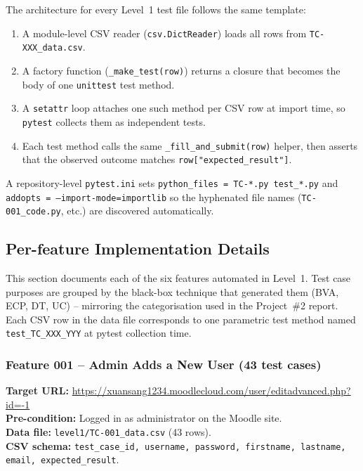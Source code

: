 \documentclass[twoside,final]{hcmut-report}
\begin{document}
The architecture for every Level~1 test file follows the same template:
\begin{enumerate}
    \item A module-level CSV reader (\texttt{csv.DictReader}) loads all rows from \texttt{TC-XXX\_data.csv}.
    \item A factory function (\texttt{\_make\_test(row)}) returns a closure that becomes the body of one \texttt{unittest} test method.
    \item A \texttt{setattr} loop attaches one such method per CSV row at import time, so \texttt{pytest} collects them as independent tests.
    \item Each test method calls the same \texttt{\_fill\_and\_submit(row)} helper, then asserts that the observed outcome matches \texttt{row["expected\_result"]}.
\end{enumerate}

A repository-level \texttt{pytest.ini} sets \texttt{python\_files = TC-*.py test\_*.py} and \texttt{addopts = --import-mode=importlib} so the hyphenated file names (\texttt{TC-001\_code.py}, etc.) are discovered automatically.

\subsection{Per-feature Implementation Details}

This section documents each of the six features automated in Level~1. Test
case purposes are grouped by the black-box technique that generated them
(BVA, ECP, DT, UC) -- mirroring the categorisation used in the Project~\#2
report. Each CSV row in the data file corresponds to one parametric test
method named \texttt{test\_TC\_XXX\_YYY} at pytest collection time.

\subsubsection{Feature 001 -- Admin Adds a New User (43 test cases)}

\textbf{Target URL:} \url{https://xuansang1234.moodlecloud.com/user/editadvanced.php?id=-1}\\
\textbf{Pre-condition:} Logged in as administrator on the Moodle site.\\
\textbf{Data file:} \texttt{level1/TC-001\_data.csv} (43 rows).\\
\textbf{CSV schema:} \texttt{test\_case\_id, username, password, firstname, lastname, email, expected\_result}.
\end{document}
